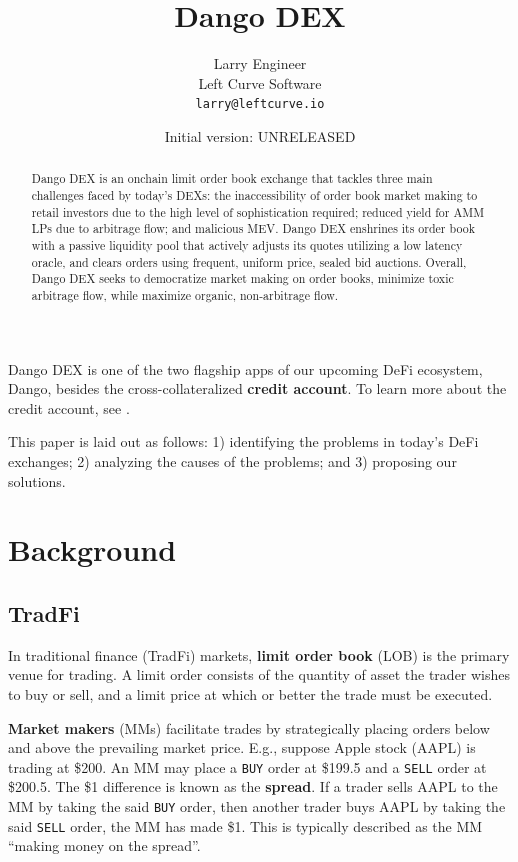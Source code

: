 \documentclass{article}
\title{Dango DEX}
\author{
  Larry Engineer \\
	Left Curve Software \\
	\texttt{larry@leftcurve.io} \\
}
\date{Initial version: UNRELEASED}
\begin{document}
\maketitle

\begin{abstract}
  Dango DEX is an onchain limit order book exchange that tackles three main challenges faced by today's DEXs: the inaccessibility of order book market making to retail investors due to the high level of sophistication required; reduced yield for AMM LPs due to arbitrage flow; and malicious MEV. Dango DEX enshrines its order book with a passive liquidity pool that actively adjusts its quotes utilizing a low latency oracle, and clears orders using frequent, uniform price, sealed bid auctions. Overall, Dango DEX seeks to democratize market making on order books, minimize toxic arbitrage flow, while maximize organic, non-arbitrage flow.
\end{abstract}

Dango DEX is one of the two flagship apps of our upcoming DeFi ecosystem, Dango,\supercite{dangotwitter} besides the cross-collateralized \textbf{credit account}. To learn more about the credit account, see \cite{creditaccountmarsforum,creditaccountbuidlkeynote}.

This paper is laid out as follows: 1) identifying the problems in today's DeFi exchanges; 2) analyzing the causes of the problems; and 3) proposing our solutions.

\section{Background}

\subsection{TradFi}

In traditional finance (TradFi) markets, \textbf{limit order book} (LOB) is the primary venue for trading. A limit order consists of the quantity of asset the trader wishes to buy or sell, and a limit price at which or better the trade must be executed.

\textbf{Market makers} (MMs) facilitate trades by strategically placing orders below and above the prevailing market price. E.g., suppose Apple stock (AAPL) is trading at \$200. An MM may place a \texttt{BUY} order at \$199.5 and a \texttt{SELL} order at \$200.5. The \$1 difference is known as the \textbf{spread}. If a trader sells AAPL to the MM by taking the said \texttt{BUY} order, then another trader buys AAPL by taking the said \texttt{SELL} order, the MM has made \$1. This is typically described as the MM ``making money on the spread''.
\end{document}
